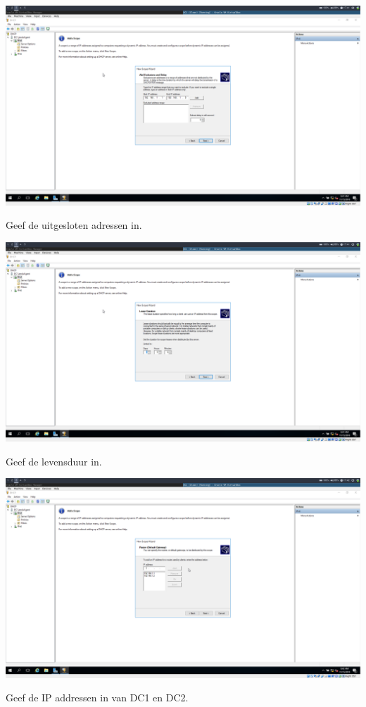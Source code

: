 \documentclass[a4paper]{article}
\begin{document}
\begin{center}
	\includegraphics[width=15cm]{Pictures/DC1/DHCP/1542300111.png}
	
	Geef de uitgesloten adressen in.
\end{center}
\begin{center}
	\includegraphics[width=15cm]{Pictures/DC1/DHCP/1542300114.png}
	
	Geef de levensduur in.
\end{center}
\begin{center}
	\includegraphics[width=15cm]{Pictures/DC1/DHCP/1542300144.png}
	
	Geef de IP addressen in van DC1 en DC2.
\end{center}
\end{document}
